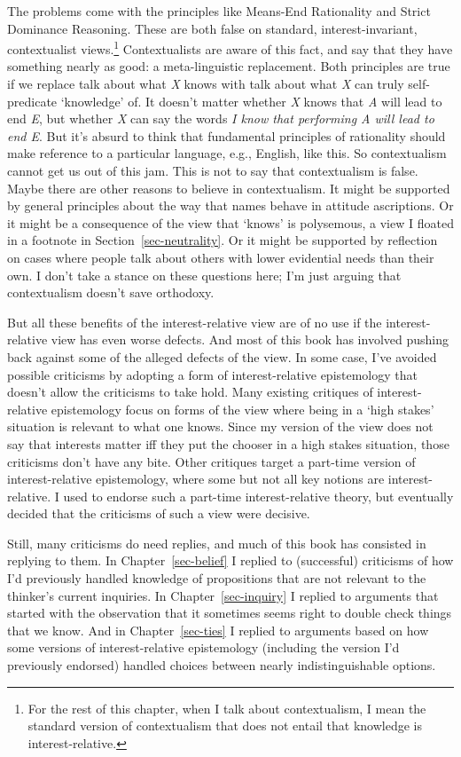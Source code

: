 \documentclass[
  12pt,
  letterpaper,
]{scrbook}
\begin{document}
The problems come with the principles like Means-End Rationality and
Strict Dominance Reasoning. These are both false on standard,
interest-invariant, contextualist views.\footnote{For the rest of this
  chapter, when I talk about contextualism, I mean the standard version
  of contextualism that does not entail that knowledge is
  interest-relative.} Contextualists are aware of this fact, and say
that they have something nearly as good: a meta-linguistic replacement.
Both principles are true if we replace talk about what \emph{X} knows
with talk about what \emph{X} can truly self-predicate `knowledge' of.
It doesn't matter whether \emph{X} knows that \emph{A} will lead to end
\emph{E}, but whether \emph{X} can say the words \emph{I know that
performing A will lead to end E}. But it's absurd to think that
fundamental principles of rationality should make reference to a
particular language, e.g., English, like this. So contextualism cannot
get us out of this jam. This is not to say that contextualism is false.
Maybe there are other reasons to believe in contextualism. It might be
supported by general principles about the way that names behave in
attitude ascriptions. Or it might be a consequence of the view that
`knows' is polysemous, a view I floated in a footnote in
Section~\ref{sec-neutrality}. Or it might be supported by reflection on
cases where people talk about others with lower evidential needs than
their own. I don't take a stance on these questions here; I'm just
arguing that contextualism doesn't save orthodoxy.

But all these benefits of the interest-relative view are of no use if
the interest-relative view has even worse defects. And most of this book
has involved pushing back against some of the alleged defects of the
view. In some case, I've avoided possible criticisms by adopting a form
of interest-relative epistemology that doesn't allow the criticisms to
take hold. Many existing critiques of interest-relative epistemology
focus on forms of the view where being in a `high stakes' situation is
relevant to what one knows. Since my version of the view does not say
that interests matter iff they put the chooser in a high stakes
situation, those criticisms don't have any bite. Other critiques target
a part-time version of interest-relative epistemology, where some but
not all key notions are interest-relative. I used to endorse such a
part-time interest-relative theory, but eventually decided that the
criticisms of such a view were decisive.

Still, many criticisms do need replies, and much of this book has
consisted in replying to them. In Chapter~\ref{sec-belief} I replied to
(successful) criticisms of how I'd previously handled knowledge of
propositions that are not relevant to the thinker's current inquiries.
In Chapter~\ref{sec-inquiry} I replied to arguments that started with
the observation that it sometimes seems right to double check things
that we know. And in Chapter~\ref{sec-ties} I replied to arguments based
on how some versions of interest-relative epistemology (including the
version I'd previously endorsed) handled choices between nearly
indistinguishable options.
\end{document}
